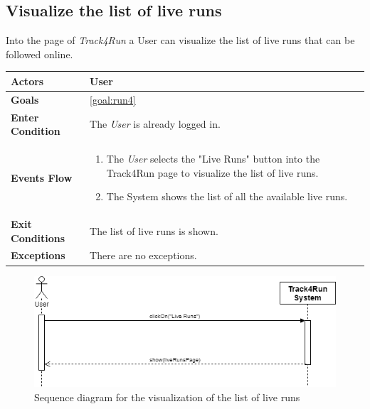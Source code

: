  \subsection{Visualize the list of live runs}
Into the page of \emph{Track4Run} a User can visualize the list of live runs that can be followed online.

\begin{table}[H]
	\centering
    
    \begin{tabular}{|p{3.5cm}|p{10.3cm}|}
    
    \hline
    \textbf{\large{Actors}}  			& \tabitem User 	\\
    				 					
    \hline
    \textbf{\large{Goals}} 				& \ref{goal:run4}\\
    
    \hline
    \textbf{\large{Enter Condition}}	& The \emph{User} is already logged in.		\\
    
    \hline
    \textbf{\large{Events Flow}}		& \begin{enumerate}[leftmargin=0.5cm]
                                          	\item The \emph{User} selects the "Live Runs" button into the Track4Run page to visualize the list of live runs.
                                          	 \item The System shows the list of all the available live runs.
                                          \end{enumerate}
    										\\
    \hline
    \textbf{\large{Exit Conditions}}    & The list of live runs is shown.\\
    
    \hline
    \textbf{\large{Exceptions}} 		& There are no exceptions.\\
    
    \hline
    
    
    \end{tabular}
	
\end{table}

\begin{figure}[H]
    \centering
    \includegraphics[scale=0.4]{Pictures/visListLiveRunsSeqDiag.png}
    \caption{Sequence diagram for the visualization of the list of live runs}
\end{figure}

